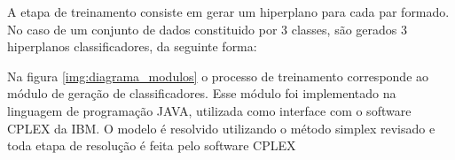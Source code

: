 A etapa de treinamento consiste em gerar um hiperplano para cada par formado. No caso de um conjunto de dados constituido por 3 classes, são gerados 3 hiperplanos classificadores, da seguinte forma: 
\begin{figure}[h!]
\centering
{}
\qquad
{}
\qquad
{}
\label{img:linear_sepa}
\end{figure}

Na figura \ref{img:diagrama_modulos} o processo de treinamento corresponde ao módulo de geração de classificadores. Esse módulo foi implementado na linguagem de programação JAVA, utilizada como interface com o software CPLEX da IBM. O modelo é resolvido utilizando o método simplex revisado e toda etapa de resolução é feita pelo software CPLEX

